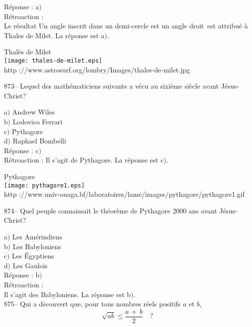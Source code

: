 ﻿\documentclass[letterpaper, 12pt]{article}
\begin{document}
R\'eponse : a$)$\\

R\'etroaction :\\
Le r\'esultat \og Un angle inscrit dans un demi-cercle est un angle
droit\fg\ est attribu\'e \`a Thales de Milet. La r\'eponse est a$)$.\\

        \begin{center}
        Thal\`es de Milet\\
    \texttt{[image: thales-de-milet.eps]}\\
        {\footnotesize http
://www.astrosurf.org/lombry/Images/thales-de-milet.jpg}
    \end{center}

873-- Lequel des math\'ematiciens suivants a v\'ecu au sixi\`eme
si\`ecle avant J\'esus-Christ?

a$)$ Andrew Wiles \\
b$)$ Lodovico Ferrari \\
c$)$ Pythagore \\
d$)$ Raphael Bombelli \\

R\'eponse : c$)$\\

R\'etroaction :
Il s'agit de Pythagore. La r\'eponse est c$)$.\\

        \begin{center}
        Pythagore\\
    \texttt{[image: pythagore1.eps]}\\
        {\footnotesize http
://www.univ-ouaga.bf/laboratoires/lame/images/pythagore/pythagore1.gif}
    \end{center}

874-- Quel peuple connaissait le th\'eor\`eme de Pythagore 2000 ans
avant J\'esus-Christ?

a$)$ Les Am\'erindiens \\
b$)$ Les Babyloniens \\
c$)$ Les \'Egyptiens \\
d$)$ Les Gaulois \\

R\'eponse : b$)$\\

R\'etroaction : \\
Il s'agit des Babyloniens. La r\'eponse est b$)$.\\

875-- Qui a d\'ecouvert que, pour tous nombres r\'eels positifs $a$ et $b$,
$$\sqrt{ab}\le\displaystyle\frac{a\,+\,b}2\quad?$$
\end{document}
